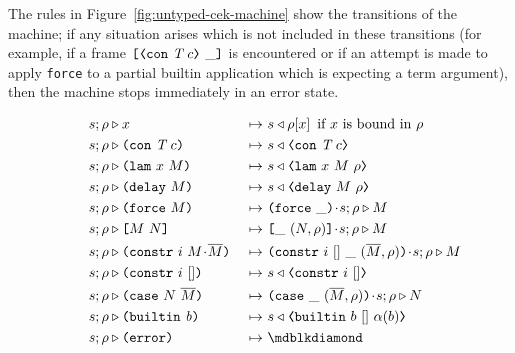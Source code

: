 The rules in Figure~\ref{fig:untyped-cek-machine} show the transitions of the
machine; if any situation arises which is not included in these transitions (for
example, if a frame $\inAppRightFrame{\VCon{\tn}{c}}$ is encountered or if an
attempt is made to apply \texttt{force} to a partial builtin application which
is expecting a term argument), then the machine stops immediately in an error
state.


\begin{figure}[H]
  \begin{subfigure}[c]{\linewidth}

    \begin{minipage}{\linewidth}
\begin{alignat*}{2}
 s;\rho & \compute x                                 &~\mapsto~& s \return  \rho[x] \enskip \text{if $x$ is bound in $\rho$}\\
 s;\rho & \compute \con{\tn}{c}                       &~\mapsto~& s \return \VCon{\tn}{c}\\
 s;\rho & \compute \lamU{x}{M}                       &~\mapsto~& s \return \VLamAbs{x}{M}{\rho}\\
 s;\rho & \compute \delay{M}                         &~\mapsto~& s\return \VDelay{M}{\rho}\\
 s;\rho & \compute \force{M}                         &~\mapsto~& \inForceFrame{} \cons s;\rho \compute M \\
 s;\rho & \compute \appU{M}{N}                       &~\mapsto~& \inAppLeftFrame{(N,\rho)} \cons s ;\rho \compute M\\
 s;\rho & \compute \constr{i}{M \cons \repetition{M}} &~\mapsto~& \inConstrFrame{i}{[]}{(\repetition{M},\rho)} \cons s ;\rho \compute M\\
 s;\rho & \compute \constr{i}{[]} &~\mapsto~&  s \return \VConstr{i}{[]}\\
 s;\rho & \compute \kase{N}{\repetition{M}} &~\mapsto~&  \inCaseFrame{(\repetition{M},\rho)} \cons s ;\rho \compute N\\
 s;\rho & \compute \builtin{b}                      &~\mapsto~& s \return \VBuiltin{b}{[]}{\arity{b}}\\
 s;\rho & \compute \errorU                           &~\mapsto~& \cekerror{}\\
\\[-10pt] %

\end{alignat*}
\end{minipage}
\end{subfigure}
\end{figure}
